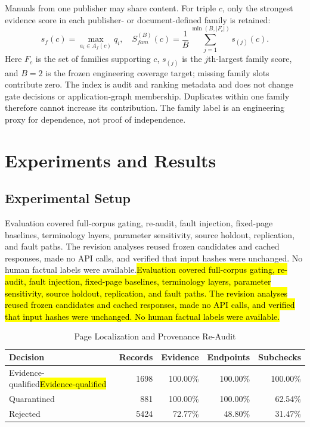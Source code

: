 \documentclass[conference,a4paper]{IEEEtran}
\DeclareRobustCommand{\rev}[1]{\ifdefined\CleanVersion#1\else\hl{#1}\fi}
\begin{document}
Manuals from one publisher may share content. For triple $c$, only the strongest evidence score in each publisher- or document-defined family is retained:
\begin{equation}
s_f(c)=\max_{a_i\in A_f(c)}q_i,\quad
S_{fam}^{(B)}(c)=\frac{1}{B}\sum_{j=1}^{\min(B,|F_c|)}s_{(j)}(c).
\label{eq:family}
\end{equation}
Here $F_c$ is the set of families supporting $c$, $s_{(j)}$ is the $j$th-largest family score, and $B=2$ is the frozen engineering coverage target; missing family slots contribute zero. The index is audit and ranking metadata and does not change gate decisions or application-graph membership. Duplicates within one family therefore cannot increase its contribution. The family label is an engineering proxy for dependence, not proof of independence.

\section{Experiments and Results}

\subsection{Experimental Setup}

\rev{Evaluation covered full-corpus gating, re-audit, fault injection, fixed-page baselines, terminology layers, parameter sensitivity, source holdout, replication, and fault paths. The revision analyses reused frozen candidates and cached responses, made no API calls, and verified that input hashes were unchanged. No human factual labels were available.}

\begin{table}[t]
\caption{Page Localization and Provenance Re-Audit}
\label{tab:audit}
\centering
\footnotesize
\setlength{\tabcolsep}{3.2pt}
\begin{tabular}{lrrrr}
\toprule
Decision & Records & Evidence & Endpoints & Subchecks \\
\midrule
\rev{Evidence-qualified} & 1698 & 100.00\% & 100.00\% & 100.00\% \\
Quarantined & 881  & 100.00\% & 100.00\% & 62.54\% \\
Rejected    & 5424 & 72.77\%  & 48.80\%  & 31.47\% \\
\bottomrule
\end{tabular}
\end{table}
\end{document}
